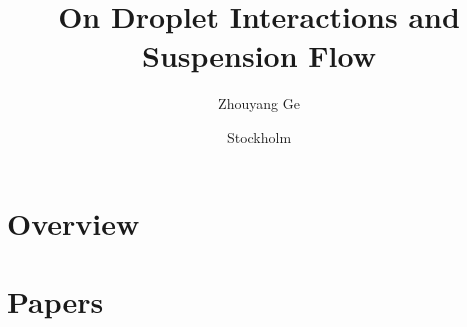 \documentclass{MechThesis}
\title[On droplet interactions and suspension flow]%
{%
	On Droplet Interactions and Suspension Flow
}%
\author{Zhouyang Ge}%
\affiliation
{%
        Linn\'e FLOW Centre and
        Swedish e-Science Research Centre (SeRC)\\
        Department of Engineering Mechanics,
        KTH Royal Institute of Technology\\
	SE--100 44 Stockholm, Sweden%
}%
\date{Stockholm}{March}{2020}%
\begin{document}
\frontmatter




\mainmatter

\part{Overview}






\tocpagebreak


\part{Papers}

%
\makepapersummary
\cleardoublepage

%


%


%


%


%

\end{document}
